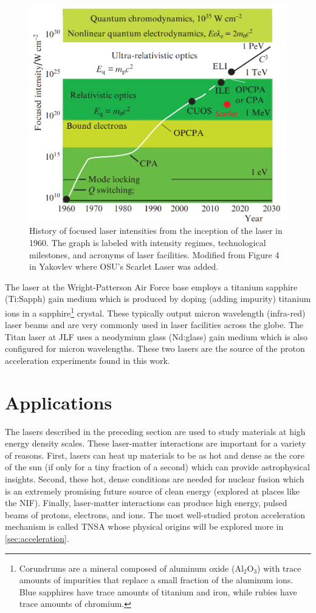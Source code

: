 \begin{figure}
	\centering
	\includegraphics[width=0.75\linewidth]{planning/images/laser_history.PNG}
	\caption{History of focused laser intensities from the inception of the laser in 1960. The graph is labeled with intensity regimes, technological milestones, and acronyms of laser facilities. Modified from Figure 4 in Yakovlev \cite{Yakovlev_2014_QE} where OSU's Scarlet Laser was added.}
	\label{fig:laser_history}
\end{figure}

The laser at the Wright-Patterson Air Force base employs a titanium sapphire (Ti:Sapph) gain medium which is produced by doping (adding impurity) titanium ions in a sapphire\footnote{Corundrums are a mineral composed of aluminum oxide ($\text{Al}_2\text{O}_3$) with trace amounts of impurities that replace a small fraction of the aluminum ions. Blue sapphires have trace amounts of titanium and iron, while rubies have trace amounts of chromium.} crystal. These typically output micron wavelength (infra-red) laser beams and are very commonly used in laser facilities across the globe. The Titan laser at \gls{JLF} uses a neodymium glass (Nd:glass) gain medium which is also configured for micron wavelengths. These two lasers are the source of the proton acceleration experiments found in this work.


\section{Applications}

The lasers described in the preceding section are used to study materials at high energy density scales. These laser-matter interactions are important for a variety of reasons. First, lasers can heat up materials to be as hot and dense as the core of the sun (if only for a tiny fraction of a second) which can provide astrophysical insights. Second, these hot, dense conditions are needed for nuclear fusion which is an extremely promising future source of clean energy (explored at places like the \gls{NIF}). Finally, laser-matter interactions can produce high energy, pulsed beams of protons, electrons, and ions. The most well-studied proton acceleration mechanism is called \gls{TNSA} whose physical origins will be explored more in \autoref{sec:acceleration}. 


